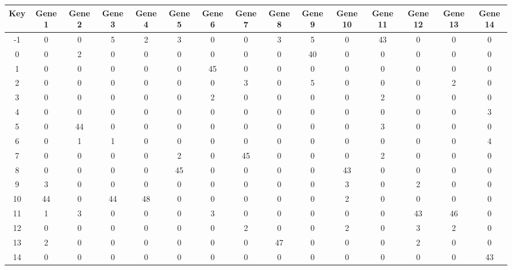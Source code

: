 \begin{tabular}{|c|c|c|c|c|c|c|c|c|c|c|c|c|c|c|}
\hline
Key & Gene 1 & Gene 2 & Gene 3 & Gene 4 & Gene 5 & Gene 6 & Gene 7 & Gene 8 & Gene 9 & Gene 10 & Gene 11 & Gene 12 & Gene 13 & Gene 14 \\
\hline
-1 & 0 & 0 & 5 & 2 & 3 & 0 & 0 & 3 & 5 & 0 & 43 & 0 & 0 & 0 \\
0 & 0 & 2 & 0 & 0 & 0 & 0 & 0 & 0 & 40 & 0 & 0 & 0 & 0 & 0 \\
1 & 0 & 0 & 0 & 0 & 0 & 45 & 0 & 0 & 0 & 0 & 0 & 0 & 0 & 0 \\
2 & 0 & 0 & 0 & 0 & 0 & 0 & 3 & 0 & 5 & 0 & 0 & 0 & 2 & 0 \\
3 & 0 & 0 & 0 & 0 & 0 & 2 & 0 & 0 & 0 & 0 & 2 & 0 & 0 & 0 \\
4 & 0 & 0 & 0 & 0 & 0 & 0 & 0 & 0 & 0 & 0 & 0 & 0 & 0 & 3 \\
5 & 0 & 44 & 0 & 0 & 0 & 0 & 0 & 0 & 0 & 0 & 3 & 0 & 0 & 0 \\
6 & 0 & 1 & 1 & 0 & 0 & 0 & 0 & 0 & 0 & 0 & 0 & 0 & 0 & 4 \\
7 & 0 & 0 & 0 & 0 & 2 & 0 & 45 & 0 & 0 & 0 & 2 & 0 & 0 & 0 \\
8 & 0 & 0 & 0 & 0 & 45 & 0 & 0 & 0 & 0 & 43 & 0 & 0 & 0 & 0 \\
9 & 3 & 0 & 0 & 0 & 0 & 0 & 0 & 0 & 0 & 3 & 0 & 2 & 0 & 0 \\
10 & 44 & 0 & 44 & 48 & 0 & 0 & 0 & 0 & 0 & 2 & 0 & 0 & 0 & 0 \\
11 & 1 & 3 & 0 & 0 & 0 & 3 & 0 & 0 & 0 & 0 & 0 & 43 & 46 & 0 \\
12 & 0 & 0 & 0 & 0 & 0 & 0 & 2 & 0 & 0 & 2 & 0 & 3 & 2 & 0 \\
13 & 2 & 0 & 0 & 0 & 0 & 0 & 0 & 47 & 0 & 0 & 0 & 2 & 0 & 0 \\
14 & 0 & 0 & 0 & 0 & 0 & 0 & 0 & 0 & 0 & 0 & 0 & 0 & 0 & 43 \\
\hline
\end{tabular}